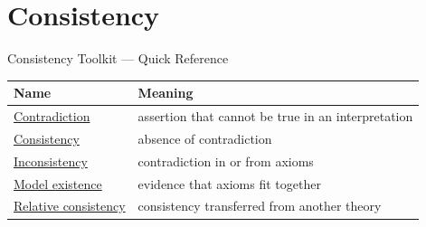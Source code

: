 \section{Consistency}

\begin{toolkitbox}{Consistency Toolkit --- Quick Reference}
\small
\begin{tabular}{l l}
\toprule
\textbf{Name}  & \textbf{Meaning} \\
\midrule
\hyperref[def:axiom-systems-contradiction]{Contradiction}  & assertion that cannot be true in an interpretation \\
\hyperref[def:axiom-systems-consistent-axiom-system]{Consistency}  & absence of contradiction \\
\hyperref[def:axiom-systems-inconsistent-axiom-system]{Inconsistency}  & contradiction in or from axioms \\
\hyperref[def:axiom-systems-model-existence-criterion]{Model existence}  & evidence that axioms fit together \\
\hyperref[def:axiom-systems-relative-consistency]{Relative consistency}  & consistency transferred from another theory \\
\bottomrule
\end{tabular}
\end{toolkitbox}


